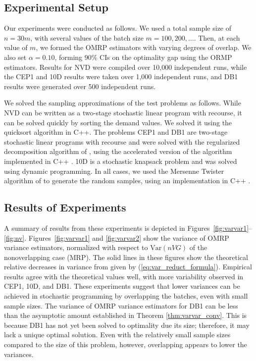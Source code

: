 \documentclass[12pt]{article}
\newcommand{\var}[1]{\mathrm{Var} \left( #1 \right)}
\begin{document}
\subsection{Experimental Setup}
\label{ssec:expS}


Our experiments were conducted as follows. 
We used a total sample size of $n = 30 m$, with several values of the batch size $m=100, 200, \ldots$. 
Then, at each value of $m$, we formed the OMRP estimators with varying degrees of overlap. 
We also set $\alpha=0.10$, forming 90\% CIs on the optimality gap using the ORMP estimators. 
Results for NVD were compiled over 10,000 independent runs, while the CEP1 and 10D results were taken over 1,000 independent runs, and DB1 results were generated over 500 independent runs.

We solved the sampling approximations of the test problems as follows.
While NVD can be written as a two-stage stochastic linear program with recourse, it can be solved quickly by sorting the demand values. 
We solved it using the quicksort algorithm in C++. 
The problems CEP1 and DB1 are two-stage stochastic linear programs with recourse and were solved with the regularized decomposition algorithm of \citet{ruszczynski1986regularized}, using the accelerated version of the algorithm implemented in C++ \citep{ruszczynski1997accelerating}. 
10D is a stochastic knapsack problem and was solved using dynamic programming.  
In all cases, we used the Mersenne Twister algorithm of \citet{matsumoto_nishimura_98} to generate the random samples, using an implementation in C++ \citep{wagner_twister_09}.




\subsection{Results of Experiments}
\label{ssec:results}

A summary of results from these experiments is depicted in Figures~\ref{fig:varvar1}--\ref{fig:nv}.
Figures~\ref{fig:varvar1} and \ref{fig:varvar2} show the variance of OMRP variance estimators, normalized with respect to $\var{nVG}$ of the nonoverlapping case (MRP). 
The solid lines in these figures show the theoretical relative decreases in variance from \citep{Welch1987} given by (\ref{eq:var_reduct_formula}). 
Empirical results agree with the theoretical values well, with more variability observed in CEP1, 10D, and DB1. 
These experiments suggest that lower variances can be achieved in stochastic programming by overlapping the batches, even with small sample sizes.
The variance of OMRP variance estimators for DB1 can be less than the asymptotic amount established in Theorem \ref{thm:varvar_conv}. %
This is because DB1 has not yet been solved to optimality due its size; therefore, it may lack a unique optimal solution. 
Even with the relatively small sample sizes compared to the size of this problem, however, overlapping appears to lower the variances. 
\end{document}
